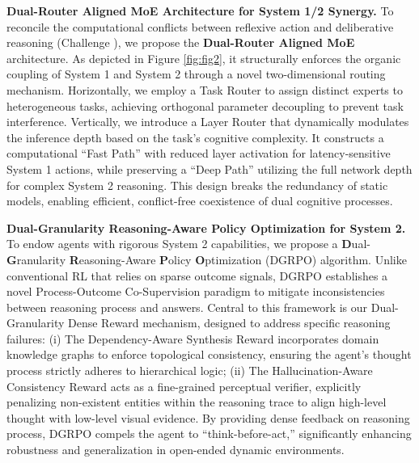 \textbf{Dual-Router Aligned MoE Architecture for System 1/2 Synergy.} To reconcile the computational conflicts between reflexive action and deliberative reasoning (Challenge \uppercase\expandafter{}), we propose the \textbf{Dual-Router Aligned MoE} architecture. As depicted in Figure \ref{fig:fig2}, it structurally enforces the organic coupling of System 1 and System 2 through a novel two-dimensional routing mechanism. Horizontally, we employ a Task Router to assign distinct experts to heterogeneous tasks, achieving orthogonal parameter decoupling to prevent task interference.  Vertically, we introduce a Layer Router that dynamically modulates the inference depth based on the task's cognitive complexity. It constructs a computational ``Fast Path'' with reduced layer activation for latency-sensitive System 1 actions, while preserving a ``Deep Path'' utilizing the full network depth for complex System 2 reasoning. This design breaks the redundancy of static models, enabling efficient, conflict-free coexistence of dual cognitive processes.



\textbf{Dual-Granularity Reasoning-Aware Policy Optimization for System 2.} To endow agents with rigorous System 2 capabilities, we propose a \textbf{D}ual-\textbf{G}ranularity \textbf{R}easoning-Aware \textbf{P}olicy \textbf{O}ptimization (DGRPO) algorithm. Unlike conventional RL that relies on sparse outcome signals, DGRPO establishes a novel Process-Outcome Co-Supervision paradigm to mitigate inconsistencies between reasoning process and answers. Central to this framework is our Dual-Granularity Dense Reward mechanism, designed to address specific reasoning failures: (i) The Dependency-Aware Synthesis Reward incorporates domain knowledge graphs to enforce topological consistency, ensuring the agent's thought process strictly adheres to hierarchical logic; (ii) The Hallucination-Aware Consistency Reward acts as a fine-grained perceptual verifier, explicitly penalizing non-existent entities within the reasoning trace to align high-level thought with low-level visual evidence. By providing dense feedback on reasoning process, DGRPO compels the agent to ``think-before-act,'' significantly enhancing robustness and generalization in open-ended dynamic environments.


